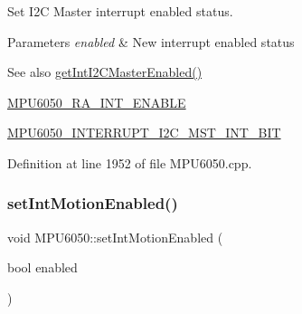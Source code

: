Set I2C Master interrupt enabled status. 
\begin{DoxyParams}{Parameters}
{\em enabled} & New interrupt enabled status \\
\hline
\end{DoxyParams}
\begin{DoxySeeAlso}{See also}
\mbox{\hyperlink{classMPU6050_a282ae29e029d88604a59c92bdf9ce252}{get\+Int\+I2\+C\+Master\+Enabled()}} 

\mbox{\hyperlink{MPU6050_8h_a1de9d9557aa7420c746721999df4a377}{M\+P\+U6050\+\_\+\+R\+A\+\_\+\+I\+N\+T\+\_\+\+E\+N\+A\+B\+LE}} 

\mbox{\hyperlink{MPU6050_8h_afb0bff7cde199d7806469f93b6e59b02}{M\+P\+U6050\+\_\+\+I\+N\+T\+E\+R\+R\+U\+P\+T\+\_\+\+I2\+C\+\_\+\+M\+S\+T\+\_\+\+I\+N\+T\+\_\+\+B\+IT}} 
\end{DoxySeeAlso}


Definition at line 1952 of file M\+P\+U6050.\+cpp.


\begin{DoxyCode}{0}

\end{DoxyCode}
\mbox{\label{classMPU6050_a2d2d1d3b03198a09c83a48ec3bc20bd8}} 
\subsubsection{\texorpdfstring{setIntMotionEnabled()}{setIntMotionEnabled()}}
{\footnotesize\ttfamily void M\+P\+U6050\+::set\+Int\+Motion\+Enabled (\begin{DoxyParamCaption}\item[{bool}]{enabled }\end{DoxyParamCaption})}


